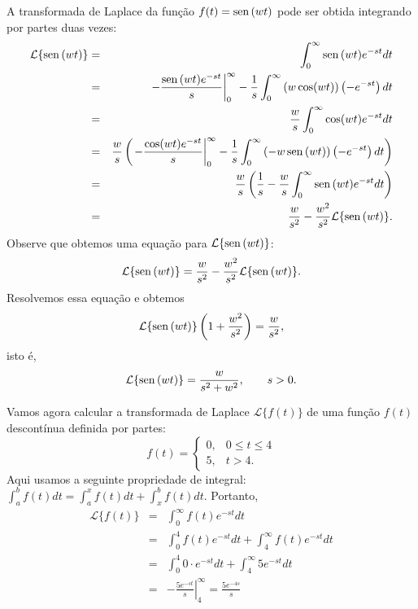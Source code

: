 \begin{ex}{\label{ex_trans_sin}}A transformada de Laplace da função $f(t)=\operatorname{sen}\,(w t)$ pode ser obtida integrando por partes duas vezes:
\begin{eqnarray*}
\mathcal{L}\{\operatorname{sen}\,(wt)\}&=&\int_0^\infty \operatorname{sen}\,(wt)e^{-st}dt\\
&=&\left.-\frac{\operatorname{sen}\,(wt)e^{-st}}{s}\right|_0^\infty-\frac{1}{s}\int_0^\infty \left(w\cos(wt)\right)\left(-e^{-st}\right)dt\\
&=&\frac{w}{s}\int_0^\infty \cos(wt)e^{-st}dt\\
&=&\frac{w}{s}\left(\left.-\frac{\cos(wt)e^{-st}}{s}\right|_0^\infty-\frac{1}{s}\int_0^\infty \left(-w\operatorname{sen}\,(wt)\right)\left(-e^{-st}\right)dt\right)\\
&=&\frac{w}{s}\left(\frac{1}{s}-\frac{w}{s}\int_0^\infty \operatorname{sen}\,(wt)e^{-st}dt\right)\\
&=&\frac{w}{s^2}-\frac{w^2}{s^2}\mathcal{L}\{\operatorname{sen}\,(wt)\} .
\end{eqnarray*}
Observe que obtemos uma equação para $\mathcal{L}\{\operatorname{sen}\,(wt)\}$:
$$
\mathcal{L}\{\operatorname{sen}\,(wt)\} =\frac{w}{s^2}-\frac{w^2}{s^2}\mathcal{L}\{\operatorname{sen}\,(wt)\} .
$$
Resolvemos essa equação e obtemos
$$
\mathcal{L}\{\operatorname{sen}\,(wt)\}\left(1+\frac{w^2}{s^2}\right)=\frac{w}{s^2},
$$
isto é,
$$
\mathcal{L}\{\operatorname{sen}\,(wt)\}=\frac{w}{s^2+w^2},\qquad s>0.
$$
\end{ex}
\begin{ex} Vamos agora calcular a transformada de Laplace $\mathcal{L}\{f(t)\}$ de uma função $f(t)$ descontínua definida por partes:
$$
f(t)=\left\{\begin{array}{ll} 0, &0\leq t\leq 4\\ 5, & t> 4.
\end{array}\right.
$$
Aqui usamos a seguinte propriedade de integral: $\int_a^b f(t)dt=\int_a^x f(t)dt+\int_x^b f(t)dt$. Portanto,
\begin{eqnarray*}
\mathcal{L}\{f(t)\}&=&\int_0^\infty f(t)e^{-st}dt\\
&=&\int_0^4 f(t)e^{-st}dt+\int_4^\infty f(t)e^{-st}dt\\
&=&\int_0^4 0\cdot e^{-st}dt+\int_4^\infty 5 e^{-st}dt\\
&=&\left.-\frac{5e^{-st}}{s}\right|_4^\infty=\frac{5e^{-4s}}{s}
\end{eqnarray*}
\end{ex}

